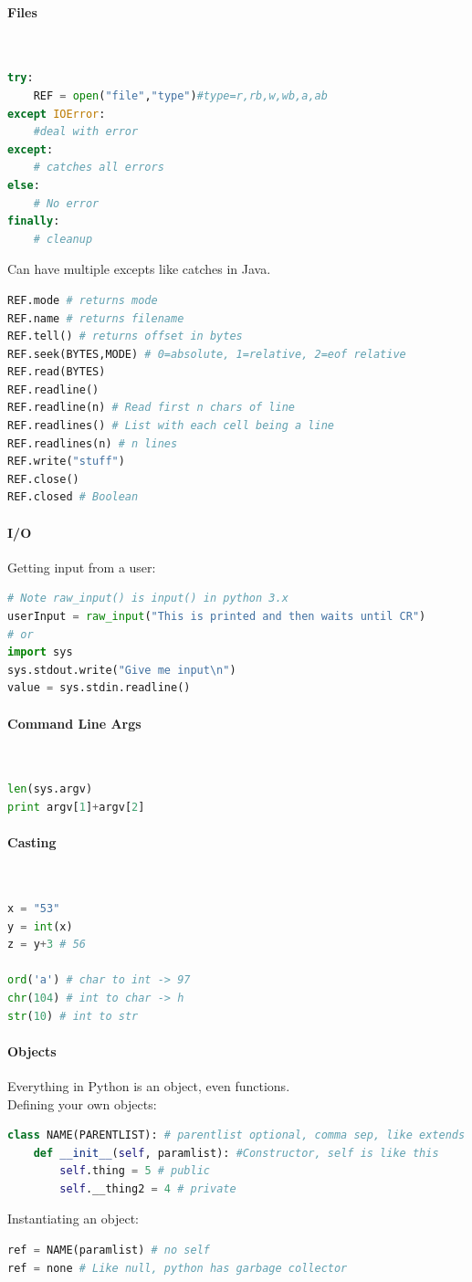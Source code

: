\documentclass[12 pt]{article}
\begin{document}
\paragraph{Files}~
\begin{lstlisting}[language=python]
try:
    REF = open("file","type")#type=r,rb,w,wb,a,ab
except IOError:
    #deal with error
except:
    # catches all errors
else: 
    # No error
finally:
    # cleanup
\end{lstlisting}
Can have multiple excepts like catches in Java.
\begin{lstlisting}[language=python]
REF.mode # returns mode
REF.name # returns filename
REF.tell() # returns offset in bytes
REF.seek(BYTES,MODE) # 0=absolute, 1=relative, 2=eof relative
REF.read(BYTES)
REF.readline()
REF.readline(n) # Read first n chars of line
REF.readlines() # List with each cell being a line
REF.readlines(n) # n lines
REF.write("stuff")
REF.close()
REF.closed # Boolean
\end{lstlisting}
\paragraph{I/O}
Getting input from a user:
\begin{lstlisting}[language=python]
# Note raw_input() is input() in python 3.x
userInput = raw_input("This is printed and then waits until CR")
# or
import sys
sys.stdout.write("Give me input\n")
value = sys.stdin.readline()
\end{lstlisting}
\paragraph{Command Line Args}~
\begin{lstlisting}[language=python]
len(sys.argv)
print argv[1]+argv[2]
\end{lstlisting}
\paragraph{Casting}~
\begin{lstlisting}[language=python]
x = "53"
y = int(x)
z = y+3 # 56

ord('a') # char to int -> 97
chr(104) # int to char -> h
str(10) # int to str
\end{lstlisting}
\paragraph{Objects}Everything in Python is an object, even functions.
\\ Defining your own objects:
\begin{lstlisting}[language=python]
class NAME(PARENTLIST): # parentlist optional, comma sep, like extends
    def __init__(self, paramlist): #Constructor, self is like this
        self.thing = 5 # public
        self.__thing2 = 4 # private
\end{lstlisting}
Instantiating an object:
\begin{lstlisting}[language=python]
ref = NAME(paramlist) # no self
ref = none # Like null, python has garbage collector
\end{lstlisting}
\end{document}
